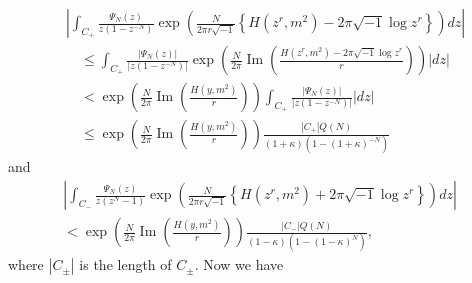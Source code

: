 \documentclass[a4paper]{amsart}
\theoremstyle{plain}
\theoremstyle{definition}
\theoremstyle{remark}
\renewcommand{\Im}{\operatorname{Im}}
\numberwithin{equation}{section}
\begin{document}
\begin{equation*}
\begin{split}
  &
  \left|
  \int_{C_{+}}
  \frac{\Psi_N(z)}{z(1-z^{-N})}
  \exp
  \left(
    \frac{N}{2\pi{r}\sqrt{-1}}
    \left\{
      H(z^r,m^2)
      -
      2\pi\sqrt{-1}\log{z^r}
    \right\}
  \right)
  dz
  \right|
  \\
  &\quad
  \le
  \int_{C_{+}}
  \frac{\left|\Psi_N(z)\right|}{\left|z(1-z^{-N})\right|}
  \exp
  \left(
    \frac{N}{2\pi}
    \Im
    \left(
      \frac{H(z^r,m^2)-2\pi\sqrt{-1}\log{z^r}}{r}
    \right)
  \right)
  |dz|
  \\
  &\quad
  <
  \exp
  \left(
    \frac{N}{2\pi}
    \Im\left(\frac{H(y,m^2)}{r}\right)
  \right)
  \int_{C_{+}}
  \frac{\left|\Psi_N(z)\right|}{\left|z(1-z^{-N})\right|}
  |dz|
  \\
  &\quad
  \le
  \exp
  \left(
    \frac{N}{2\pi}
    \Im\left(\frac{H(y,m^2)}{r}\right)
  \right)
  \frac{|C_{+}|Q(N)}{(1+\kappa)\left(1-(1+\kappa)^{-N}\right)}
\end{split}
\end{equation*}
and
\begin{multline*}
  \left|
    \int_{C_{-}}
    \frac{\Psi_N(z)}{z(z^{N}-1)}
    \exp
    \left(
      \frac{N}{2\pi{r}\sqrt{-1}}
      \left\{
        H(z^r,m^2)
        +
        2\pi\sqrt{-1}\log{z^r}
      \right\}
    \right)
    dz
  \right|
  \\
  <
  \exp
  \left(
    \frac{N}{2\pi}
    \Im\left(\frac{H(y,m^2)}{r}\right)
  \right)
  \frac{|C_{-}|Q(N)}{(1-\kappa)\left(1-(1-\kappa)^{N}\right)},
\end{multline*}
where $|C_{\pm}|$ is the length of $C_{\pm}$.
Now we have
\end{document}
